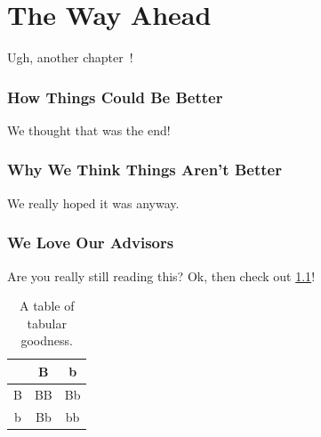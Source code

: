 \chapter{The Way Ahead}
Ugh, another chapter~\cite{ref:D}!

\subsection{How Things Could Be Better}
We thought that was the end!

\subsection{Why We Think Things Aren't Better}
We really hoped it was anyway.

\subsection{We Love Our Advisors}
Are you really still reading this? Ok, then check out \ref{tab:magic}!

\begin{table}
	\caption{\label{tab:magic} A table of tabular goodness.}
	\begin{center}
		\begin{tabular}{|c|c|c|}
			\hline
			& B & b \\
			\hline
			B & BB & Bb \\
			\hline
			b & Bb & bb \\
			\hline
		\end{tabular}
	\end{center}
\end{table}

